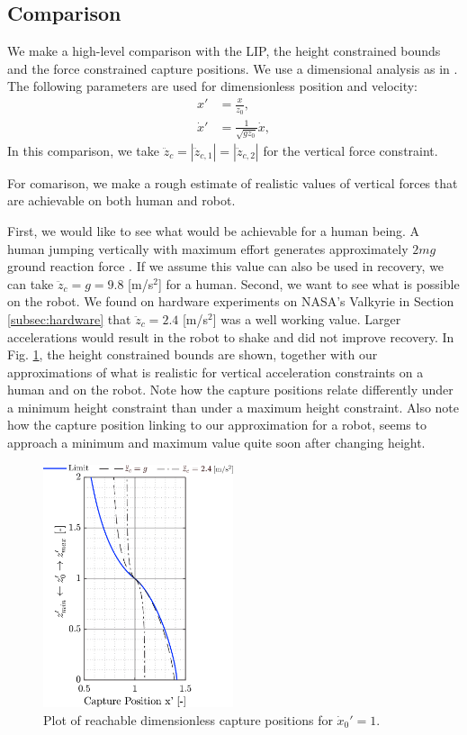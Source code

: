 \documentclass[letterpaper, 10 pt, conference]{ieeeconf}  %
\newcommand{\ddzc}{\ddot{z}_{c}}
\newcommand{\ddzcf}{\ddot{z}_{c,1}}
\newcommand{\ddzcs}{\ddot{z}_{c,2}}
\begin{document}
\subsection{Comparison}\label{sec:comparison}
We make a high-level comparison with the LIP, the height constrained bounds and the force constrained capture positions. We use a dimensional analysis as in \cite{pratt2006capture,stephens2007humanoid,koolen2012capturability}. The following parameters are used for dimensionless position and velocity:
\begin{align}
	x' &= \frac{x}{z_0}, \\
	\dot{x}' &= \frac{1}{\sqrt{gz_0}}\dot{x},
\end{align}
In this comparison, we take $\ddzc=|\ddzcf|=|\ddzcs|$ for the vertical force constraint.

For comarison, we make a rough estimate of realistic values of vertical forces that are achievable on both human and robot.

First, we would like to see what would be achievable for a human being. A human jumping vertically with maximum effort generates approximately $2mg$ ground reaction force \cite{linthorne2001analysis}. If we assume this value can also be used in recovery, we can take $\ddot{z}_c=g=9.8$ [m/s$^2$] for a human. Second, we want to see what is possible on the robot. We found on hardware experiments on NASA's Valkyrie in Section \ref{subsec:hardware} that $\ddot{z}_c=2.4$ [m/s$^2$] was a well working value. Larger accelerations would result in the robot to shake and did not improve recovery. In Fig. \ref{fig:caplimits}, the height constrained bounds are shown, together with our approximations of what is realistic for vertical acceleration constraints on a human and on the robot. Note how the capture positions relate differently under a minimum height constraint than under a maximum height constraint. Also note how the capture position linking to our approximation for a robot, seems to approach a minimum and maximum value quite soon after changing height.
\begin{figure}
      \centering
      \includegraphics[width=2.2in]{caplimits.png}
      \caption{Plot of reachable dimensionless capture positions for $\dot{x}_0'=1$. }
      \label{fig:caplimits}
\end{figure}
\end{document}
